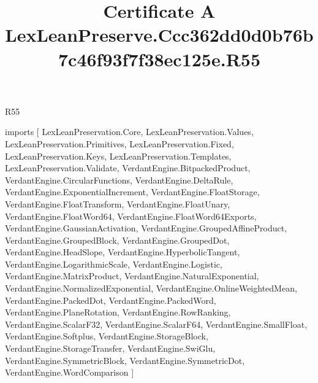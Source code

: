 \begin{lexlean}{R55}
\title{Certificate A LexLeanPreserve.Ccc362dd0d0b76b7c46f93f7f38ec125e.R55}
\begin{coremodule}
imports [
  LexLeanPreservation.Core,
  LexLeanPreservation.Values,
  LexLeanPreservation.Primitives,
  LexLeanPreservation.Fixed,
  LexLeanPreservation.Keys,
  LexLeanPreservation.Templates,
  LexLeanPreservation.Validate,
  VerdantEngine.BitpackedProduct,
  VerdantEngine.CircularFunctions,
  VerdantEngine.DeltaRule,
  VerdantEngine.ExponentialIncrement,
  VerdantEngine.FloatStorage,
  VerdantEngine.FloatTransform,
  VerdantEngine.FloatUnary,
  VerdantEngine.FloatWord64,
  VerdantEngine.FloatWord64Exports,
  VerdantEngine.GaussianActivation,
  VerdantEngine.GroupedAffineProduct,
  VerdantEngine.GroupedBlock,
  VerdantEngine.GroupedDot,
  VerdantEngine.HeadSlope,
  VerdantEngine.HyperbolicTangent,
  VerdantEngine.LogarithmicScale,
  VerdantEngine.Logistic,
  VerdantEngine.MatrixProduct,
  VerdantEngine.NaturalExponential,
  VerdantEngine.NormalizedExponential,
  VerdantEngine.OnlineWeightedMean,
  VerdantEngine.PackedDot,
  VerdantEngine.PackedWord,
  VerdantEngine.PlaneRotation,
  VerdantEngine.RowRanking,
  VerdantEngine.ScalarF32,
  VerdantEngine.ScalarF64,
  VerdantEngine.SmallFloat,
  VerdantEngine.Softplus,
  VerdantEngine.StorageBlock,
  VerdantEngine.StorageTransfer,
  VerdantEngine.SwiGlu,
  VerdantEngine.SymmetricBlock,
  VerdantEngine.SymmetricDot,
  VerdantEngine.WordComparison
]


\end{coremodule}
\end{lexlean}
